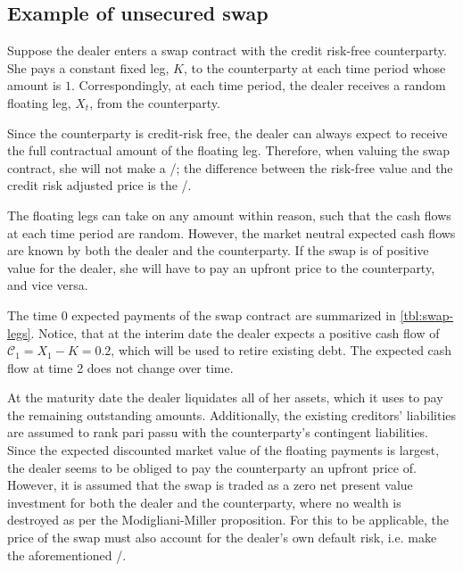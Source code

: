 \documentclass[main.tex]{subfiles}
\begin{document}
        \subsection{Example of unsecured swap}
            Suppose the dealer enters a swap contract with the credit risk-free counterparty.
            She pays a constant fixed leg, $K$, to the counterparty at each time period whose amount is $\num{1}$.
            Correspondingly, at each time period,
            the dealer receives a random floating leg, $X_t$, from the counterparty.

            Since the counterparty is credit-risk free,
            the dealer can always expect to receive the full contractual amount of the floating leg.
            Therefore, when valuing the swap contract,
            she will not make a \CVA/; 
            the difference between the risk-free value and the credit risk adjusted price is the \DVA/.

            The floating legs can take on any amount within reason,
            such that the cash flows at each time period are random.
            However, the market neutral expected cash flows are known
            by both the dealer and the counterparty.
            If the swap is of positive value for the dealer,
            she will have to pay an upfront price to the counterparty,
            and vice versa.

            The time 0 expected payments of the swap contract are summarized in \cref{tbl:swap-legs}.
            Notice, that at the interim date the dealer expects a positive cash flow of
            $\mathcal{C}_1 = X_1 - K = \num{0.2}$,
            which will be used to retire existing debt.
            The expected cash flow at time 2 does not change over time.

            At the maturity date the dealer liquidates all of her assets,
            which it uses to pay the remaining outstanding amounts.
            Additionally, the existing creditors' liabilities are assumed to rank pari passu with the counterparty's contingent liabilities.
            \\
            Since the expected discounted market value of the floating payments is largest,
            the dealer seems to be obliged to pay the counterparty an upfront price of.
            However, it is assumed that the swap is traded as a zero net present value investment
            for both the dealer and the counterparty,
            where no wealth is destroyed as per the Modigliani-Miller proposition.
            For this to be applicable, the price of the swap must also account for the dealer's own default risk,
            i.e. make the aforementioned \DVA/.
            
\end{document}
